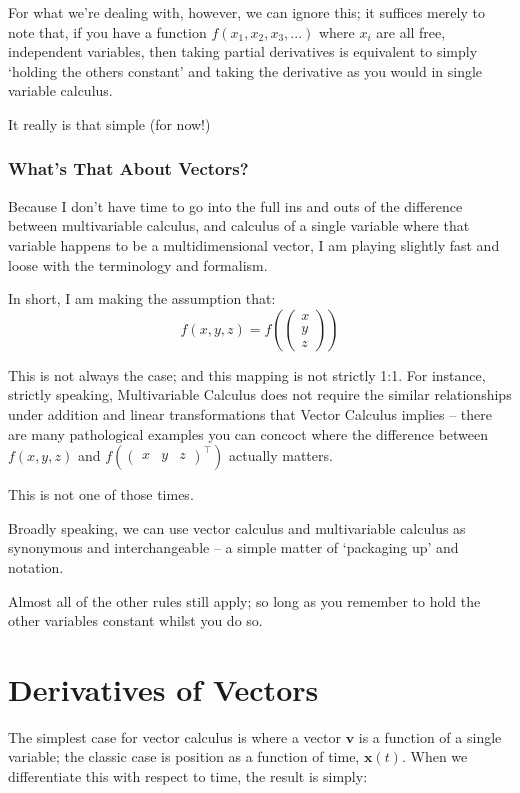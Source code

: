 \documentclass[a4paper,openany,11pt]{book}
\renewcommand\vec[1]{\boldsymbol{\mathbf{#1}}}
\begin{document}
			For what we're dealing with, however, we can ignore this; it suffices merely to note that, if you have a function $f(x_1,x_2,x_3,...)$ where $x_i$ are all free, independent variables, then taking partial derivatives is equivalent to simply `holding the others constant' and taking the derivative as you would in single variable calculus. 

			It really is that simple (for now!)
	
	
			\subsubsection{What's That About Vectors?}
	
				Because I don't have time to go into the full ins and outs of the difference between multivariable calculus, and calculus of a single variable where that variable happens to be a multidimensional vector, I am playing slightly fast and loose with the terminology and formalism. 
	
				In short, I am making the assumption that:
				$$f(x,y,z) = f\left( \begin{pmatrix} x \\ y \\ z \end{pmatrix} \right)$$
	
				This is not always the case; and this mapping is not strictly 1:1. For instance, strictly speaking, Multivariable Calculus does not require the similar relationships under addition and linear transformations that Vector Calculus implies -- there are many pathological examples you can concoct where the difference between $f(x,y,z)$ and $f\left( \begin{pmatrix} x & y & z \end{pmatrix}^\intercal \right)$ actually matters. 
	
				This is not one of those times. 
	
				Broadly speaking, we can use vector calculus and multivariable calculus as synonymous and interchangeable -- a simple matter of `packaging up' and notation.


			Almost all of the other rules still apply; so long as you remember to hold the other variables constant whilst you do so. 

		\section{Derivatives of Vectors}

			The simplest case for vector calculus is where a vector $\vec{v}$ is a function of a single variable; the classic case is position as a function of time, $\vec{x}(t)$. When we differentiate this with respect to time, the result is simply:
\end{document}
